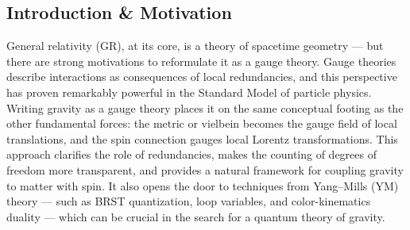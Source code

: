 \documentclass[a0,portrait]{a0poster}
\begin{document}
\begin{multicols}{2} %








\section*{Introduction \& Motivation}

General relativity (GR), at its core, is a theory of spacetime geometry --- 
but there are strong motivations to reformulate it as a gauge theory. 
Gauge theories describe interactions as consequences of local redundancies, 
and this perspective has proven remarkably powerful in the Standard Model of 
particle physics. Writing gravity as a gauge theory places it on the same 
conceptual footing as the other fundamental forces: the metric or 
vielbein becomes the gauge field of local translations, and the spin 
connection gauges local Lorentz transformations. This approach 
clarifies the role of redundancies, makes the counting of degrees 
of freedom more transparent, and provides a natural framework for 
coupling gravity to matter with spin. It also opens the door to 
techniques from Yang–Mills (YM) theory --- such as BRST 
quantization, loop variables, and color-kinematics duality --- 
which can be crucial in the search for a quantum theory of gravity.



\end{multicols}
\end{document}
